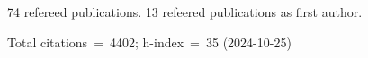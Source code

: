 74 refereed publications. 13 refeered publications as first author.

Total citations~=~4402; h-index~=~35 (2024-10-25)